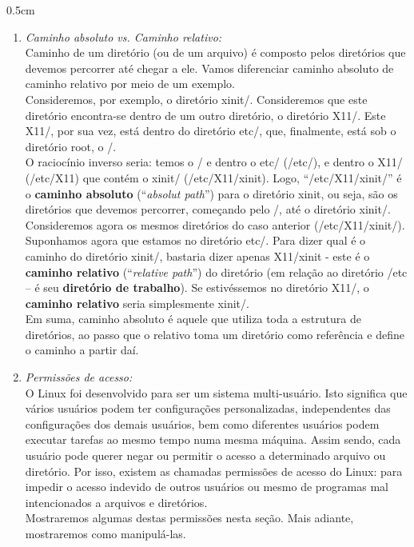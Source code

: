 \begin{refsection}
\begin {myindentpar}{0.5cm}
\begin{enumerate}[\itshape i.]
  \item \textit{Caminho absoluto vs. Caminho relativo:}\\
Caminho de um diretório (ou de um arquivo) é composto pelos diretórios que devemos percorrer até chegar a ele. Vamos diferenciar caminho absoluto de caminho relativo por meio de um exemplo.\\
Consideremos, por exemplo, o diretório xinit/. Consideremos que este diretório encontra-se dentro de um outro diretório, o diretório X11/. Este X11/, por sua vez, está dentro do diretório etc/, que, finalmente, está sob o diretório root, o /.\\
O raciocínio inverso seria: temos o / e dentro o etc/ (/etc/), e dentro o X11/ (/etc/X11) que contém o xinit/ (/etc/X11/xinit). Logo, ``/etc/X11/xinit/'' é o \textbf{caminho absoluto} (``\textit{absolut path}'') para o diretório xinit, ou seja, são os diretórios que devemos percorrer, começando pelo /, até o diretório xinit/.\\
Consideremos agora os mesmos diretórios do caso anterior (/etc/X11/xinit/). Suponhamos agora que estamos no diretório etc/. Para dizer qual é o caminho do diretório xinit/, bastaria dizer apenas X11/xinit - este é o \textbf{caminho relativo} (``\textit{relative path}'') do diretório (em relação ao diretório /etc -- é seu \textbf{diretório de trabalho}). Se estivéssemos no diretório X11/, o \textbf{caminho relativo} seria simplesmente xinit/.\\
Em suma, caminho absoluto é aquele que utiliza toda a estrutura de diretórios, ao passo que o relativo toma um diretório como referência e define o caminho a partir daí.\\

  \item \textit{Permissões de acesso:}\\
O Linux foi desenvolvido para ser um sistema multi-usuário. Isto significa que vários usuários podem ter configurações personalizadas, independentes das configurações dos demais usuários, bem como diferentes usuários podem executar tarefas ao mesmo tempo numa mesma máquina. Assim sendo, cada usuário pode querer negar ou permitir o acesso a determinado arquivo ou diretório. Por isso, existem as chamadas permissões de acesso do Linux: para impedir o acesso indevido de outros usuários ou mesmo de programas mal intencionados a arquivos e diretórios.\\
Mostraremos algumas destas permissões nesta seção. Mais adiante, mostraremos como manipulá-las.


\end{enumerate}
\end{myindentpar}
\end{refsection}
